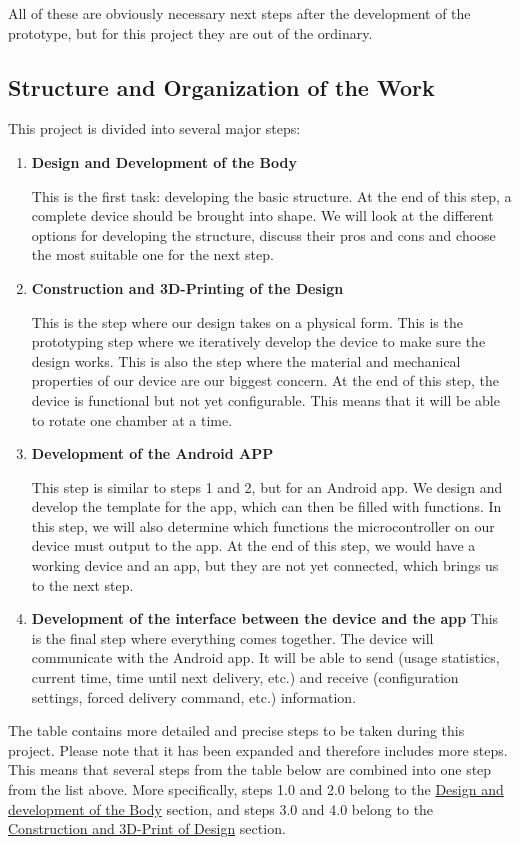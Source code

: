 All of these are obviously necessary next steps after the development of the prototype, but for this project they are out of the ordinary.
\newpage
\subsection{Structure and Organization of the Work}
This project is divided into several major steps:
\begin{enumerate}
	\item{\textbf{Design and Development of the Body}}
	
	This is the first task: developing the basic structure. At the end of this step, a complete device should be brought into shape. We will look at the different options for developing the structure, discuss their pros and cons and choose the most suitable one for the next step.
	\item{\textbf{Construction and 3D-Printing of the Design}}
	
	This is the step where our design takes on a physical form. This is the prototyping step where we iteratively develop the device to make sure the design works. This is also the step where the material and mechanical properties of our device are our biggest concern. At the end of this step, the device is functional but not yet configurable. This means that it will be able to rotate one chamber at a time.
	\item{\textbf{Development of the Android APP}}
	
	This step is similar to steps 1 and 2, but for an Android app. We design and develop the template for the app, which can then be filled with functions. In this step, we will also determine which functions the microcontroller on our device must output to the app.
	At the end of this step, we would have a working device and an app, but they are not yet connected, which brings us to the next step.
	\item{\textbf{\textbf{Development of the interface between the device and the app}}}
	This is the final step where everything comes together. The device will communicate with the Android app. It will be able to send (usage statistics, current time, time until next delivery, etc.) and receive (configuration settings, forced delivery command, etc.) information.
\end{enumerate}
The table contains more detailed and precise steps to be taken during this project. Please note that it has been expanded and therefore includes more steps. This means that several steps from the table below are combined into one step from the list above. More specifically, steps 1.0 and 2.0 belong to the \hyperref[sec:Bodydesign]{Design and development of the Body} section, and steps 3.0 and 4.0 belong to the \hyperref[sec:3DPrint]{Construction and 3D-Print of Design} section.
